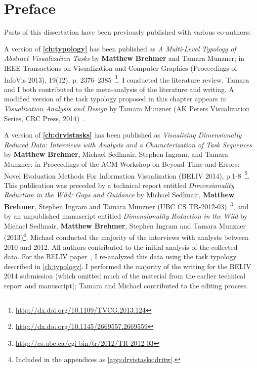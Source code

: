 
\chapter{Preface}

Parts of this dissertation have been previously published with various co-authors:

A version of {\bf \autoref{ch:typology}} has been published as {\it A Multi-Level Typology of Abstract Visualization Tasks} by {\bf Matthew Brehmer} and Tamara Munzner; in IEEE Transactions on Visualization and Computer Graphics (Proceedings of InfoVis 2013), 19(12), p. 2376--2385~\cite{Brehmer2013}\footnote{\url{http://dx.doi.org/10.1109/TVCG.2013.124}}.
I conducted the literature review. 
Tamara and I both contributed to the meta-analysis of the literature and writing.
A modified version of the task typology proposed in this chapter appears in {\it Visualization Analysis and Design} by Tamara Munzner (AK Peters Visualization Series, CRC Press, 2014)~\cite{Munzner2014}.

A version of {\bf \autoref{ch:drvistasks}} has been published as {\it Visualizing Dimensionally Reduced Data: Interviews with Analysts and a Characterization of Task Sequences} by {\bf Matthew Brehmer}, Michael Sedlmair, Stephen Ingram, and Tamara Munzner; in Proceedings of the ACM Workshop on Beyond Time and Errors: Novel Evaluation Methods For Information Visualization (BELIV 2014), p.1-8~\cite{Brehmer2014b}\footnote{\url{http://dx.doi.org/10.1145/2669557.2669559}}. 
This publication was preceded by a technical report entitled {\it Dimensionality Reduction in the Wild: Gaps and Guidance} by Michael Sedlmair, {\bf Matthew Brehmer}, Stephen Ingram and Tamara Munzner (UBC CS TR-2012-03)~\cite{Sedlmair2012b}\footnote{\url{http://cs.ubc.ca/cgi-bin/tr/2012/TR-2012-03}}, and by an unpublished manuscript entitled {\it Dimensionality Reduction in the Wild} by Michael Sedlmair, {\bf Matthew Brehmer}, Stephen Ingram and Tamara Munzner (2013)\footnote{Included in the appendices as \autoref{app:drvistasks:dritw}.}. 
Michael conducted the majority of the interviews with analysts between 2010 and 2012. 
All authors contributed to the initial analysis of the collected data. 
For the BELIV paper~\cite{Brehmer2014b}, I re-analyzed this data using the task typology described in \autoref{ch:typology}. 
I performed the majority of the writing for the BELIV 2014 submission (which omitted much of the material from the earlier technical report and manuscript); Tamara and Michael contributed to the editing process.

